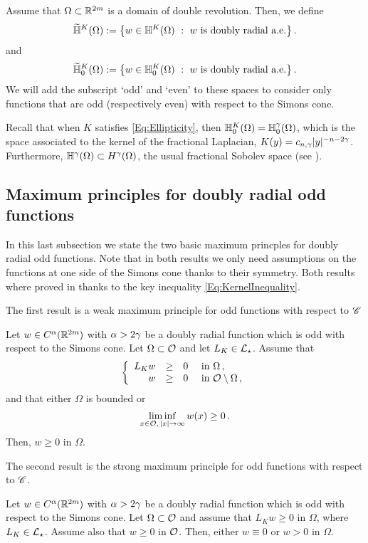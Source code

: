 Assume that $\Omega \subset \mathbb{R}^{2m}$ is a domain of double revolution. Then, we define
$$
\widetilde{\mathbb{H}}^K(\Omega) := \left \{ w \in \mathbb{H}^K(\Omega) \ : \ w \textrm{ is doubly radial a.e.} \right \}.
$$
and
$$
\widetilde{\mathbb{H}}^K_0(\Omega) := \left \{ w \in \mathbb{H}^K_0(\Omega) \ : \ w \textrm{ is doubly radial a.e.} \right \}.
$$
We will add the subscript `odd' and `even' to these spaces to consider only functions that are odd (respectively even) with respect to the Simons cone.

Recall that when $K$ satisfies \eqref{Eq:Ellipticity}, then $\mathbb{H}^K_0 (\Omega) = \mathbb{H}^\gamma_0 (\Omega)$, which is the space associated to the kernel of the fractional Laplacian, $K(y) = c_{n,\gamma}|y|^{-n-2\gamma}$. Furthermore, $\mathbb{H}^\gamma(\Omega) \subset H^\gamma(\Omega)$, the usual fractional Sobolev space (see \cite{HitchhikerGuide,CozziPassalacqua}). 


\subsection{Maximum principles for doubly radial odd functions}
\label{Subsec:MaxPrinciples}

In this last subsection we state the two basic maximum princples for doubly radial odd functions. Note that in both results we only need assumptions on the functions at one side of the Simons cone thanks to their symmetry. Both results where proved in \cite{FelipeSanz-Perela:IntegroDifferentialI} thanks to the key inequality \eqref{Eq:KernelInequality}.

The first result is a weak maximum principle for odd functions with respect to $\mathscr{C}$

\begin{proposition}
\label{Prop:WeakMaximumPrincipleForOddFunctions}
Let $w\in C^{\alpha}(\mathbb{R}^{2m})$ with $\alpha > 2\gamma$ be a doubly radial function which is odd with respect to the Simons cone. Let $\Omega \subset \mathcal{O}$ and let $L_K \in \mathcal{L}_\star$. Assume that
$$
\left\{\begin{array}{rcll}
L_K w & \geq & 0 & \text{ in } \Omega\,,\\
w & \geq & 0 & \text{ in } \mathcal{O} \setminus \Omega\,,
\end{array} \right.
$$
and that either $\Omega$ is bounded or 
$$
\liminf_{x \in \mathcal{O},\,|x|\to \infty} w(x) \geq 0\,.
$$
Then, $w \geq 0$ in $\Omega$.
\end{proposition}

The second result is the strong maximum principle for odd functions with respect to $\mathscr{C}$.

\begin{proposition}
\label{Prop:StrongMaximumPrincipleForOddFunctions} 
Let $w\in C^{\alpha}(\mathbb{R}^{2m})$ with $\alpha > 2\gamma$ be a doubly radial function which is odd with respect to the Simons cone. Let $\Omega \subset \mathcal{O}$ and assume that $L_K w \geq 0$ in $\Omega$, where $L_K \in \mathcal{L}_\star$. Assume also that $w\geq 0$ in $\mathcal{O}$. Then, either $w\equiv 0$ or $w > 0$ in $\Omega$.
\end{proposition}






